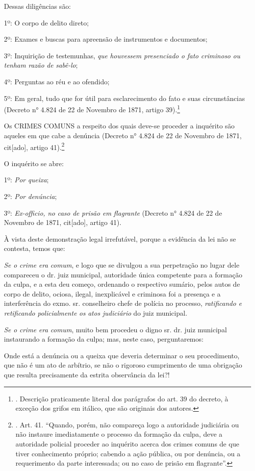 Dessas diligências são:

1º: O corpo de delito direto;

2º: Exames e buscas para apreensão de instrumentos e documentos;

3º: Inquirição de testemunhas, \emph{que houvessem presenciado o fato
criminoso ou tenham razão de sabê-lo};

4º: Perguntas ao réu e ao ofendido;

5º: Em geral, tudo que for útil para esclarecimento do fato e suas
circunstâncias (Decreto n° 4.824 de 22 de Novembro de 1871, artigo
39).\footnote{. Descrição praticamente literal dos parágrafos do art. 39
  do decreto, à exceção dos grifos em itálico, que são originais dos
  autores.}

Os CRIMES COMUNS a respeito dos quais deve-se proceder a inquérito são
aqueles em que cabe a denúncia (Decreto n° 4.824 de 22 de Novembro de
1871, cit{[}ado{]}, artigo 41).\footnote{. Art. 41. ``Quando, porém, não
  compareça logo a autoridade judiciária ou não instaure imediatamente o
  processo da formação da culpa, deve a autoridade policial proceder ao
  inquérito acerca dos crimes comuns de que tiver conhecimento próprio;
  cabendo a ação pública, ou por denúncia, ou a requerimento da parte
  interessada; ou no caso de prisão em flagrante''.}

O inquérito se abre:

1º: \emph{Por queixa};

2º: \emph{Por denúncia};

3º: \emph{Ex-officio, no caso de prisão em flagrante} (Decreto n° 4.824
de 22 de Novembro de 1871, cit{[}ado{]}, artigo 41).

À vista deste demonstração legal irrefutável, porque a evidência da lei
não se contesta, temos que:

\emph{Se o crime era comum}, e logo que se divulgou a sua perpetração no
lugar dele compareceu o dr. juiz municipal, autoridade única competente
para a formação da culpa, e a esta deu começo, ordenando o respectivo
sumário, pelos autos de corpo de delito, ociosa, ilegal, inexplicável e
criminosa foi a presença e a interferência do exmo. sr. conselheiro
chefe de polícia no processo, \emph{ratificando e retificando
policialmente os atos judiciário} do juiz municipal.

\emph{Se o crime era comum}, muito bem procedeu o digno sr. dr. juiz
municipal instaurando a formação da culpa; mas, neste caso,
perguntaremos:

Onde está a denúncia ou a queixa que deveria determinar o seu
procedimento, que não é um ato de arbítrio, se não o rigoroso
cumprimento de uma obrigação que resulta precisamente da estrita
observância da lei?!

